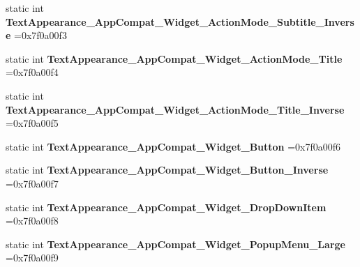 \begin{DoxyCompactItemize}
\item 
\mbox{\label{classandroid_1_1support_1_1v7_1_1recyclerview_1_1R_1_1style_a66ca1694238f56f87b1d7c9966c54ed4}} 
static int {\bfseries Text\+Appearance\+\_\+\+App\+Compat\+\_\+\+Widget\+\_\+\+Action\+Mode\+\_\+\+Subtitle\+\_\+\+Inverse} =0x7f0a00f3
\item 
\mbox{\label{classandroid_1_1support_1_1v7_1_1recyclerview_1_1R_1_1style_a3322c6e45ab1a0eb5f4979dce79750d4}} 
static int {\bfseries Text\+Appearance\+\_\+\+App\+Compat\+\_\+\+Widget\+\_\+\+Action\+Mode\+\_\+\+Title} =0x7f0a00f4
\item 
\mbox{\label{classandroid_1_1support_1_1v7_1_1recyclerview_1_1R_1_1style_a8ddcc0fc4cc803047aaf7978416880fb}} 
static int {\bfseries Text\+Appearance\+\_\+\+App\+Compat\+\_\+\+Widget\+\_\+\+Action\+Mode\+\_\+\+Title\+\_\+\+Inverse} =0x7f0a00f5
\item 
\mbox{\label{classandroid_1_1support_1_1v7_1_1recyclerview_1_1R_1_1style_aeff28623b30aab613574c5b96132e459}} 
static int {\bfseries Text\+Appearance\+\_\+\+App\+Compat\+\_\+\+Widget\+\_\+\+Button} =0x7f0a00f6
\item 
\mbox{\label{classandroid_1_1support_1_1v7_1_1recyclerview_1_1R_1_1style_a49c19bd35a01218d4b1f895a1313e31a}} 
static int {\bfseries Text\+Appearance\+\_\+\+App\+Compat\+\_\+\+Widget\+\_\+\+Button\+\_\+\+Inverse} =0x7f0a00f7
\item 
\mbox{\label{classandroid_1_1support_1_1v7_1_1recyclerview_1_1R_1_1style_ac5cc4bff173ba63dee5944e1eb647c6c}} 
static int {\bfseries Text\+Appearance\+\_\+\+App\+Compat\+\_\+\+Widget\+\_\+\+Drop\+Down\+Item} =0x7f0a00f8
\item 
\mbox{\label{classandroid_1_1support_1_1v7_1_1recyclerview_1_1R_1_1style_a516bc39f481c537bf18b6d77c04a6218}} 
static int {\bfseries Text\+Appearance\+\_\+\+App\+Compat\+\_\+\+Widget\+\_\+\+Popup\+Menu\+\_\+\+Large} =0x7f0a00f9

\end{DoxyCompactItemize}

